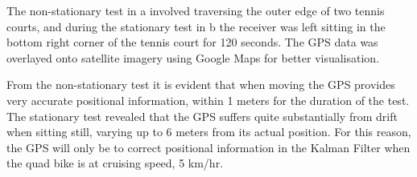 \documentclass[main.tex]{subfiles}
\begin{document}
The non-stationary test in a involved traversing the outer edge of two tennis courts, and during the stationary test in b the receiver was left sitting in the bottom right corner of the tennis court for 120 seconds. The GPS data was overlayed onto satellite imagery using Google Maps for better visualisation.

From the non-stationary test it is evident that when moving the GPS provides very accurate positional information, within 1 meters for the duration of the test. The stationary test revealed that the GPS suffers quite substantially from drift when sitting still, varying up to 6 meters from its actual position. For this reason, the GPS will only be to correct positional information in the Kalman Filter when the quad bike is at cruising speed, 5 km/hr.
\end{document}
